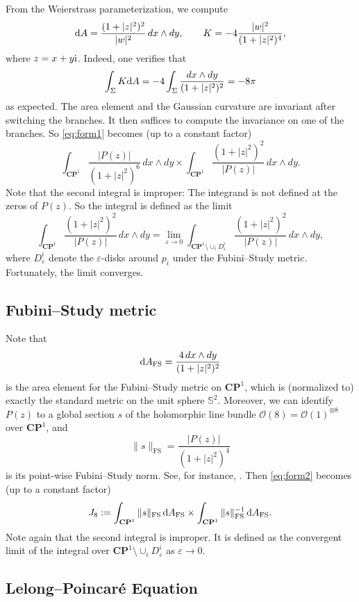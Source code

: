 \documentclass[a4paper]{amsart}
\newcommand{\CP}{\mathbf{CP}}
\newcommand{\cO}{\mathcal{O}}
\newcommand{\FS}{\text{FS}}
\newcommand{\uS}{\mathbb{S}}
\newcommand{\ii}{{\rm i}}
\newcommand{\dd}{{\rm d}}
\theoremstyle{plain} %
\theoremstyle{definition} %
\theoremstyle{remark}
\begin{document}
From the Weierstrass parameterization, we compute
\[
	\dd A = \frac{(1+|z|^2)^2}{|w|^2} \, dx \wedge dy, \qquad K = -4 \frac{|w|^2}{(1+|z|^2)^4},
\]
where $z = x + y \ii$.  Indeed, one verifies that
\[
	\int_\Sigma K \dd A = -4 \int_\Sigma \frac{dx \wedge dy}{(1+|z|^2)^2} = - 8 \pi
\]
as expected.  The area element and the Gaussian curvature are invariant after
switching the branches.  It then suffices to compute the invariance on one of
the branches.  So \eqref{eq:form1} becomes (up to a constant factor)
\begin{equation}\label{eq:form2}
	\int_{\CP^1} \frac{|P(z)|}{(1+|z|^2)^6} \, dx \wedge dy \times
	\int_{\CP^1} \frac{(1+|z|^2)^2}{|P(z)|} \, dx \wedge dy.
\end{equation}
Note that the second integral is improper: The integrand is not defined at the
zeros of $P(z)$.  So the integral is defined as the limit
\[
	\int_{\CP^1} \frac{(1+|z|^2)^2}{|P(z)|} \, dx \wedge dy
	= \lim_{\varepsilon \to 0}
	\int_{\CP^1 \setminus \cup_i D^i_\varepsilon} \frac{(1+|z|^2)^2}{|P(z)|} \, dx \wedge dy,
\]
where $D^i_\varepsilon$ denote the $\varepsilon$-disks around $p_i$ under the
Fubini--Study metric.  Fortunately, the limit converges.

\subsection{Fubini--Study metric}

Note that
\[
	\dd A_\FS = \frac{4 \, dx \wedge dy}{(1+|z|^2)^2}
\]
is the area element for the Fubini--Study metric on $\CP^1$, which is
(normalized to) exactly the standard metric on the unit sphere $\uS^2$.
Moreover, we can identify $P(z)$ to a global section $s$ of the holomorphic
line bundle $\cO(8) = \cO(1)^{\otimes 8}$ over $\CP^1$, and
\[
	\|s\|_\FS = \frac{|P(z)|}{(1+|z|^2)^4}
\]
is its point-wise Fubini--Study norm.  See, for instance,
\cite{huybrechts2005}.  Then \eqref{eq:form2} becomes (up to a constant factor)
\begin{equation}\label{eq:form3}
	J_8 := 
	\int_{\CP^1} \| s \|_\FS \, \dd A_\FS \times
	\int_{\CP^1} \| s \|_\FS^{-1} \, \dd A_\FS. 
\end{equation}
Note again that the second integral is improper.  It is defined as the
convergent limit of the integral over $\CP^1 \setminus \cup_i D^i_\varepsilon$
as $\varepsilon \to 0$.

\subsection{Lelong--Poincar\'e Equation}
\end{document}
